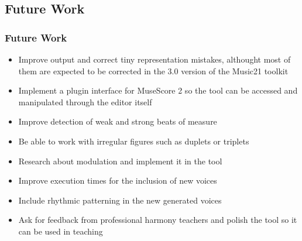 \documentclass[english]{beamer}
\begin{document}
\subsection{Future Work}
	\begin{frame}
		\frametitle{Future Work}
		\begin{itemize}
			\item Improve output and correct tiny representation mistakes, althought most of them are expected to be corrected in the 3.0 version of the Music21 toolkit
			\item Implement a plugin interface for MuseScore 2 so the tool can be accessed and manipulated through the editor itself
			\item Improve detection of weak and strong beats of measure
			\item Be able to work with irregular figures such as duplets or triplets
			\item Research about modulation and implement it in the tool
			\item Improve execution times for the inclusion of new voices
			\item Include rhythmic patterning in the new generated voices
			\item Ask for feedback from professional harmony teachers and polish the tool so it can be used in teaching
		\end{itemize}
	\end{frame}
\end{document}
